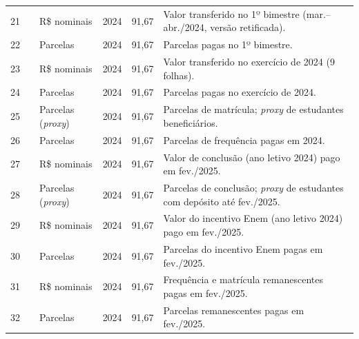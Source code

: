 \begin{apendicesenv}
\begin{landscape}
{\begin{longtable}{c p{6.2cm} p{4.4cm} p{2.9cm} C{1.5cm} p{6.0cm}}
        21 &     & R\$ nominais                   & 2024             & 91,67 & Valor transferido no 1º bimestre (mar.--abr./2024, versão retificada). \\
        22 &      & Parcelas                       & 2024             & 91,67 & Parcelas pagas no 1º bimestre. \\
        23 &          & R\$ nominais                   & 2024             & 91,67 & Valor transferido no exercício de 2024 (9 folhas). \\
        24 &           & Parcelas                       & 2024             & 91,67 & Parcelas pagas no exercício de 2024. \\
        25 &    & Parcelas (\textit{proxy})      & 2024             & 91,67 & Parcelas de matrícula; \textit{proxy} de estudantes beneficiários. \\
        26 &   & Parcelas                       & 2024             & 91,67 & Parcelas de frequência pagas em 2024. \\
        27 &                & R\$ nominais                   & 2024             & 91,67 & Valor de conclusão (ano letivo 2024) pago em fev./2025. \\
        28 &       & Parcelas (\textit{proxy})      & 2024             & 91,67 & Parcelas de conclusão; \textit{proxy} de estudantes com depósito até fev./2025. \\
        29 &                     & R\$ nominais                   & 2024             & 91,67 & Valor do incentivo Enem (ano letivo 2024) pago em fev./2025. \\
        30 &            & Parcelas                       & 2024             & 91,67 & Parcelas do incentivo Enem pagas em fev./2025. \\
        31 &                   & R\$ nominais                   & 2024             & 91,67 & Frequência e matrícula remanescentes pagas em fev./2025. \\
        32 &          & Parcelas                       & 2024             & 91,67 & Parcelas remanescentes pagas em fev./2025. \\

\end{longtable}}
\end{landscape}
\end{apendicesenv}
